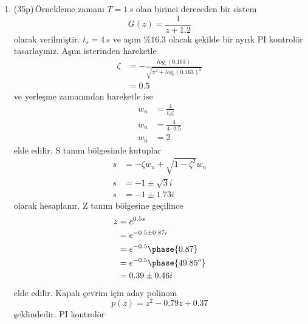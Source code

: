 \begin{enumerate}[\bfseries S1.]
    \item (35p)\,Örnekleme zamanı $T=1\,s$ olan birinci dereceden bir sistem 
    \begin{equation}
        G(z)=\frac{1}{z+1.2}
    \end{equation}
    olarak verilmiştir. $t_s=4\,s$ ve aşım $\%16.3$ olacak şekilde bir ayrık PI kontrolör tasarlayınız. Aşım isterinden hareketle
    \begin{equation}
    \begin{split}
        \zeta&=-\frac{log_e(0.163)}{\sqrt{\pi^2+log_e(0.163)^2}}\\
        &=0.5
    \end{split}
    \end{equation}
    ve yerleşme zamanından hareketle ise 
    \begin{equation}
        \begin{split}
            w_n&=\frac{4}{t_s\zeta}\\
            w_n&=\frac{4}{4\cdot 0.5}\\
            w_n&=2
        \end{split}
    \end{equation}
    elde edilir. S tanım bölgesinde kutuplar
    \begin{equation}
    \begin{split}
        s&=-\zeta w_n+\sqrt{1-\zeta^2}w_n\\
        s&=-1\pm \sqrt{3}i\\
        s&=-1\pm 1.73i
    \end{split}
    \end{equation}
    olarak hesaplanır. Z tanım bölgesine geçilince
    \begin{equation}
        \begin{split}
            z&=e^{0.5s}\\
            &=e^{-0.5\pm 0.87i}\\
            &=e^{-0.5}\phase{0.87}\\
            &=e^{-0.5}\phase{49.85^o}\\
            &=0.39\pm0.46i
        \end{split}
    \end{equation}
    elde edilir. Kapalı çevrim için aday polinom
    \begin{equation}
        p(z)=z^2-0.79z+0.37
    \end{equation}
    şeklindedir. PI kontrolör
    \begin{equation}

\end{equation}
\end{enumerate}
